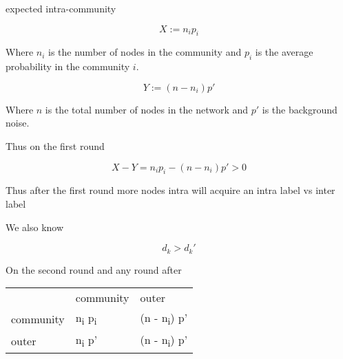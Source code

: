 \documentclass[11pt]{article}
\begin{document}
expected intra-community

\[
 X := n_i p_i
\]

Where \(n_i\) is the number of nodes in the community and \(p_i\) is the average probability in the community \(i\).

\[
 Y := (n - n_i) p'
\]

Where \(n\) is the total number of nodes in the network and \(p'\) is the background noise.

Thus on the first round

\[
 X - Y = n_i p_i - (n - n_i) p' > 0
\]

Thus after the first round more nodes intra will acquire an intra label vs inter label

We also know

\[
 d_k > d_k'
\]

On the second round and any round after

\begin{center}
\begin{tabular}{lll}
 & community & outer\\
community & n\textsubscript{i} p\textsubscript{i} & (n - n\textsubscript{i}) p'\\
outer & n\textsubscript{i} p' & (n - n\textsubscript{i}) p'\\
\end{tabular}
\end{center}
\end{document}
